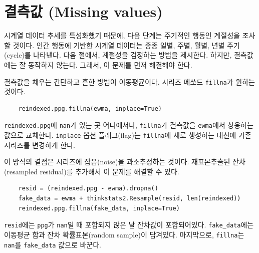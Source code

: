 \section{결측값 (Missing values)}

시계열 데이터 추세를 특성화했기 때문에, 다음 단계는 주기적인 행동인 계절성을 조사할 것이다. 인간 행동에 기반한 시계열 데이터는 종종 일별, 주별, 월별, 년별 주기(cycle)를 나타낸다. 다음 절에서, 계절성을 검정하는 방법을 제시한다. 하지만, 결측값에는 잘 동작하지 않는다. 그래서, 이 문제를 먼저 해결해야 한다.


결측값을 채우는 간단하고 흔한 방법이 이동평균이다.
시리즈 메쏘드 {\tt fillna}가 원하는 것이다.


\begin{verbatim}
    reindexed.ppg.fillna(ewma, inplace=True)
\end{verbatim}

{\tt reindexed.ppg}에 {\tt nan}가 있는 곳 어디에서나, {\tt fillna}가 결측값을 {\tt ewma}에서 상응하는 값으로 교체한다. {\tt inplace} 옵션 플래그(flag)는 {\tt fillna}에 새로 생성하는 대신에 기존 시리즈를 변경하게 한다.

이 방식의 결점은 시리즈에 잡음(noise)을 과소추정하는 것이다. 재표본추출된 잔차(resampled residual)를 추가해서 이 문제를 해결할 수 있다.


\begin{verbatim}
    resid = (reindexed.ppg - ewma).dropna()
    fake_data = ewma + thinkstats2.Resample(resid, len(reindexed))
    reindexed.ppg.fillna(fake_data, inplace=True)
\end{verbatim}


{\tt resid}에는 {\tt ppg}가 {\tt nan}일 때 포함되지 않은 날 잔차값이 포함되어있다. \verb"fake_data"에는 이동평균 합과 잔차 확률표본(random sample)이 담겨있다. 마지막으로, {\tt fillna}는 {\tt nan}를 \verb"fake_data" 값으로 바꾼다.

